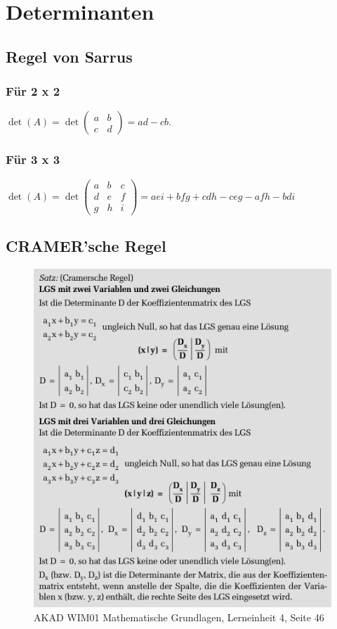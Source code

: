 \documentclass[a4paper,12pt]{scrartcl}
\begin{document}
\newpage
\section{Determinanten}
\subsection{Regel von Sarrus}
\subsubsection{Für 2 x 2}

$
\det(A) = 
\det \begin{pmatrix}
a & b \\ 
c & d 
\end{pmatrix} = ad - cb.
$

\subsubsection{Für 3 x 3}
$ \det(A) = \det
\begin{pmatrix}
  a & b & c \\
  d & e & f \\
  g & h & i
\end{pmatrix} = aei + bfg + cdh - ceg -afh -bdi
$

\newpage
\subsection{CRAMER'sche Regel}
\begin{figure}[ht]
	\centering
  \includegraphics[width=1.0\textwidth]{wim01-zusammenfassung_cramersche_regel.png}
	\caption{AKAD WIM01 Mathematische Grundlagen, Lerneinheit 4, Seite 46}
	\label{fig01}
\end{figure}
\end{document}
